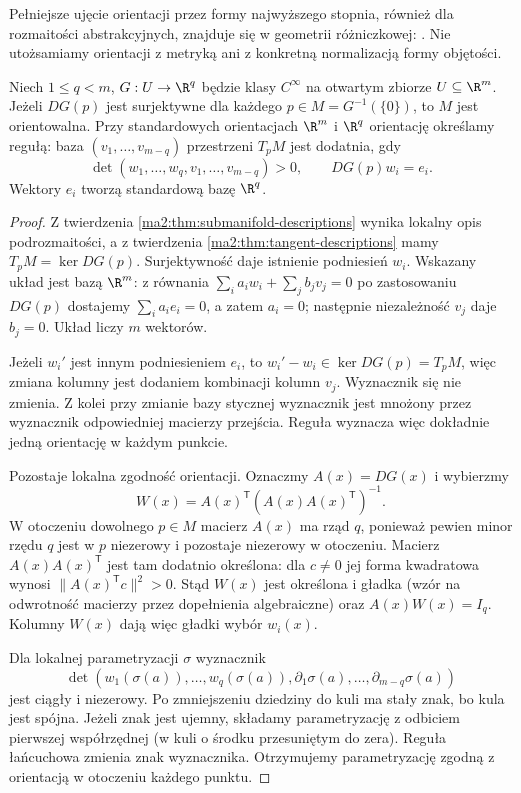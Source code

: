 Pełniejsze ujęcie orientacji przez formy najwyższego
stopnia, również dla rozmaitości abstrakcyjnych,
znajduje się w geometrii różniczkowej:
.
Nie utożsamiamy orientacji z metryką ani z konkretną
normalizacją formy objętości.

\begin{stwierdzenie}
\label{ma2:prop:orientation-level}
Niech $1\le q<m$, $G:U\to\R^q$ będzie klasy
$C^\infty$ na otwartym zbiorze $U\subseteq\R^m$.
Jeżeli $DG(p)$ jest surjektywne dla każdego
$p\in M=G^{-1}(\{0\})$, to $M$ jest orientowalna.
Przy standardowych orientacjach $\R^m$ i $\R^q$
orientację określamy regułą: baza
$(v_1,\ldots,v_{m-q})$ przestrzeni $T_pM$ jest
dodatnia, gdy
\[
 \det(w_1,\ldots,w_q,v_1,\ldots,v_{m-q})>0,
 \qquad DG(p)w_i=e_i.
\]
Wektory $e_i$ tworzą standardową bazę $\R^q$.
\end{stwierdzenie}
\begin{proof}
Z twierdzenia \ref{ma2:thm:submanifold-descriptions}
wynika lokalny opis podrozmaitości, a z twierdzenia
\ref{ma2:thm:tangent-descriptions} mamy
$T_pM=\ker DG(p)$. Surjektywność daje istnienie
podniesień $w_i$. Wskazany układ jest bazą $\R^m$:
z równania
$\sum_i a_iw_i+\sum_j b_jv_j=0$ po zastosowaniu
$DG(p)$ dostajemy $\sum_i a_ie_i=0$, a zatem
$a_i=0$; następnie niezależność $v_j$ daje $b_j=0$.
Układ liczy $m$ wektorów.

Jeżeli $w_i'$ jest innym podniesieniem $e_i$, to
$w_i'-w_i\in\ker DG(p)=T_pM$, więc zmiana kolumny
jest dodaniem kombinacji kolumn $v_j$. Wyznacznik
się nie zmienia. Z kolei przy zmianie bazy stycznej
wyznacznik jest mnożony przez wyznacznik odpowiedniej
macierzy przejścia. Reguła wyznacza więc dokładnie
jedną orientację w każdym punkcie.

Pozostaje lokalna zgodność orientacji. Oznaczmy
$A(x)=DG(x)$ i wybierzmy
\[
 W(x)=A(x)^{\mathsf T}
            (A(x)A(x)^{\mathsf T})^{-1}.
\]
W otoczeniu dowolnego $p\in M$ macierz $A(x)$ ma
rząd $q$, ponieważ pewien minor rzędu $q$ jest w
$p$ niezerowy i pozostaje niezerowy w otoczeniu.
Macierz $A(x)A(x)^{\mathsf T}$ jest tam dodatnio
określona: dla $c\ne0$ jej forma kwadratowa wynosi
$\|A(x)^{\mathsf T}c\|^2>0$. Stąd $W(x)$ jest
określona i gładka (wzór na odwrotność macierzy
przez dopełnienia algebraiczne) oraz $A(x)W(x)=I_q$.
Kolumny $W(x)$ dają więc gładki wybór $w_i(x)$.

Dla lokalnej parametryzacji $\sigma$ wyznacznik
\[
 \det(w_1(\sigma(a)),\ldots,w_q(\sigma(a)),
                  \partial_1\sigma(a),\ldots,\partial_{m-q}\sigma(a))
\]
jest ciągły i niezerowy. Po zmniejszeniu dziedziny
do kuli ma stały znak, bo kula jest spójna.
Jeżeli znak jest ujemny, składamy parametryzację
z odbiciem pierwszej współrzędnej (w kuli
o środku przesuniętym do zera). Reguła łańcuchowa
zmienia znak wyznacznika. Otrzymujemy parametryzację
zgodną z orientacją w otoczeniu każdego punktu.
\end{proof}

